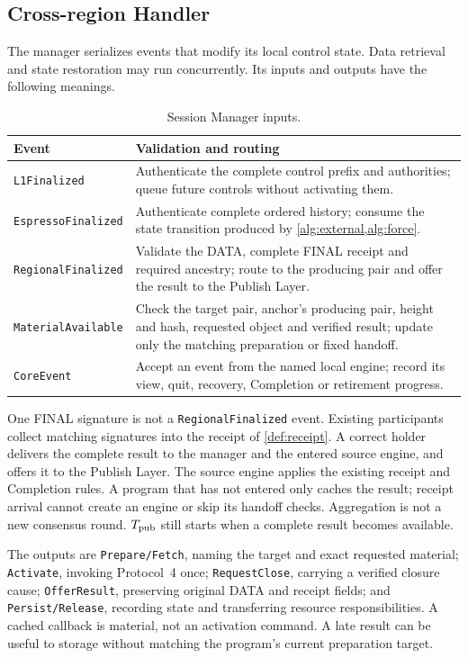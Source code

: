 \subsection{Cross-region Handler}
\label{sec:session-manager}
The manager serializes events that modify its local control state.
Data retrieval and state restoration may run concurrently. Its
inputs and outputs have the following meanings.

\begin{table}[htbp]\centering\small
\caption{Session Manager inputs.}
\label{tab:manager-inputs}
\begin{tabularx}{\linewidth}{@{}p{.24\linewidth}Y@{}}\toprule
Event & Validation and routing\\\midrule
\texttt{L1Finalized} & Authenticate the complete control prefix and
authorities; queue future controls without activating them.\\
\texttt{EspressoFinalized} & Authenticate complete ordered history;
consume the state transition produced by \cref{alg:external,alg:force}.\\
\texttt{RegionalFinalized} & Validate the DATA, complete FINAL receipt
and required ancestry; route to the producing pair and offer the result
to the Publish Layer.\\
\texttt{MaterialAvailable} & Check the target pair, anchor's producing
pair, height and hash, requested object and verified result; update only
the matching preparation or fixed handoff.\\
\texttt{CoreEvent} & Accept an event from the named local engine;
record its view, quit, recovery, Completion or retirement progress.\\\bottomrule
\end{tabularx}
\end{table}

One FINAL signature is not a \texttt{RegionalFinalized} event. Existing
participants collect matching signatures into the receipt of
\cref{def:receipt}. A correct holder delivers the complete result to
the manager and the entered source engine, and offers it to the Publish
Layer. The source engine applies the existing receipt and Completion
rules. A program that has not entered only caches the result; receipt
arrival cannot create an engine or skip its handoff checks. Aggregation
is not a new consensus round. $T_{\rm pub}$ still starts when a complete
result becomes available.

The outputs are \texttt{Prepare/Fetch}, naming the target and exact
requested material; \texttt{Activate}, invoking Protocol~4 once;
\texttt{RequestClose}, carrying a verified closure cause;
\texttt{OfferResult}, preserving original DATA and receipt fields;
and \texttt{Persist/Release}, recording state and transferring resource
responsibilities. A cached callback is material, not an activation
command. A late result can be useful to storage without matching the
program's current preparation target.

